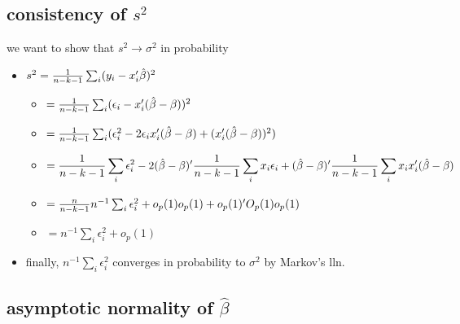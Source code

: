 \subsection{consistency of $s^2$}

     we want to show that $s^2 \to \sigma^2$ in probability
\begin{itemize}
\item $s^2 = {1 \over n - k - 1} \sum_i (y_i - x_i'\hat\beta)^2$
\begin{itemize}
\item $= {1 \over n - k - 1} \sum_i (\epsilon_i - x_i'(\hat\beta-\beta))^2$
\item $= {1 \over n - k - 1} \sum_i (\epsilon_i^2 - 2 \epsilon_i
         x_i'(\hat\beta-\beta) + (x_i'(\hat\beta-\beta))^2)$
\item \[= {1 \over n - k - 1} \sum_i \epsilon_i^2 - 2 (\hat\beta -
         \beta)' {1 \over n - k - 1} \sum_i  x_i \epsilon_i +
         (\hat\beta - \beta)' {1 \over n - k - 1} \sum_i x_i x_i'
         (\hat\beta - \beta)\]
\item $=  {n \over n - k - 1} n^{-1} \sum_i \epsilon_i^2 + o_p(1)
         o_p(1) + o_p(1)'O_p(1)o_p(1)$
\item $= n^{-1} \sum_i \epsilon_i^2 + o_p(1)$
\end{itemize}
\item finally, $n^{-1} \sum_i \epsilon_i^2$ converges in probability
       to $\sigma^2$ by Markov's lln.
\end{itemize}

\subsection{asymptotic normality of $\hat\beta$}

